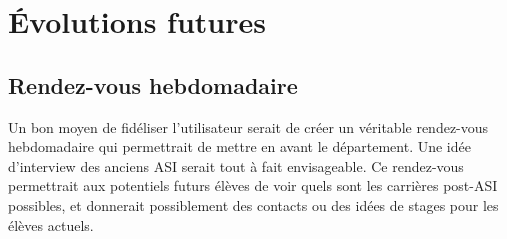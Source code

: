 \section{Évolutions futures}
\subsection{Rendez-vous hebdomadaire}
	Un bon moyen de fidéliser l'utilisateur serait de créer un véritable rendez-vous hebdomadaire qui permettrait de mettre en avant le département. 
	Une idée d'interview des anciens ASI serait tout à fait envisageable. Ce rendez-vous permettrait aux potentiels futurs élèves de voir quels sont les carrières post-ASI possibles, et donnerait possiblement des contacts ou des idées de stages pour les élèves actuels.